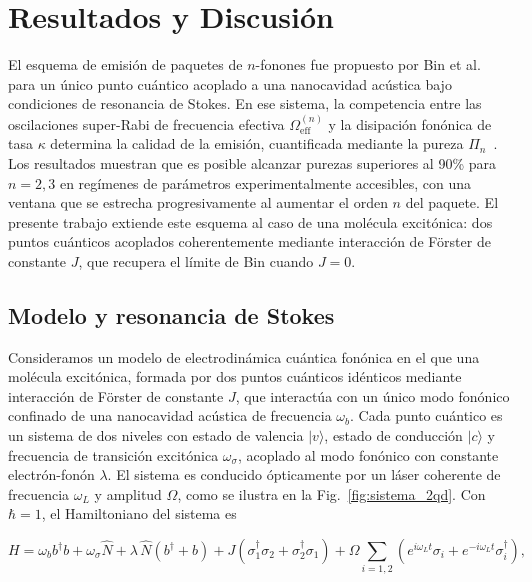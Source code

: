\chapter{Resultados y Discusión}
\graphicspath{{../../codes/results/oficial/pgf/}{../../codes/results/oficial/}}

El esquema de emisión de paquetes de $n$-fonones fue propuesto por Bin et al.~\cite{bin2020} para un único punto cuántico acoplado a una nanocavidad acústica bajo condiciones de resonancia de Stokes. En ese sistema, la competencia entre las oscilaciones super-Rabi de frecuencia efectiva $\Omega_\mathrm{eff}^{(n)}$ y la disipación fonónica de tasa $\kappa$ determina la calidad de la emisión, cuantificada mediante la pureza $\Pi_n$~\cite{munoz2014,munoz2018}. Los resultados muestran que es posible alcanzar purezas superiores al 90\% para $n = 2, 3$ en regímenes de parámetros experimentalmente accesibles, con una ventana que se estrecha progresivamente al aumentar el orden $n$ del paquete. El presente trabajo extiende este esquema al caso de una molécula excitónica: dos puntos cuánticos acoplados coherentemente mediante interacción de Förster de constante $J$, que recupera el límite de Bin cuando $J = 0$.

\section{Modelo y resonancia de Stokes}

Consideramos un modelo de electrodinámica cuántica fonónica en el que una molécula excitónica, formada por dos puntos cuánticos idénticos mediante interacción de Förster de constante $J$, que interactúa con un único modo fonónico confinado de una nanocavidad acústica de frecuencia $\omega_b$. Cada punto cuántico es un sistema de dos niveles con estado de valencia $|v\rangle$, estado de conducción $|c\rangle$ y frecuencia de transición excitónica $\omega_\sigma$, acoplado al modo fonónico con constante electrón-fonón $\lambda$. El sistema es conducido ópticamente por un láser coherente de frecuencia $\omega_L$ y amplitud $\Omega$, como se ilustra en la Fig.~\ref{fig:sistema_2qd}. Con $\hbar = 1$, el Hamiltoniano del sistema es

\begin{equation}
	H = \omega_b b^\dagger b
	+ \omega_\sigma \hat{N}
	+ \lambda\,\hat{N}(b^\dagger + b)
	+ J\!\left(\sigma_1^\dagger\sigma_2 + \sigma_2^\dagger\sigma_1\right)
	+ \Omega\sum_{i=1,2}\!\left(e^{i\omega_L t}\sigma_i
	+ e^{-i\omega_L t}\sigma_i^\dagger\right),
	\label{eq:Hlab_texto}
\end{equation}

